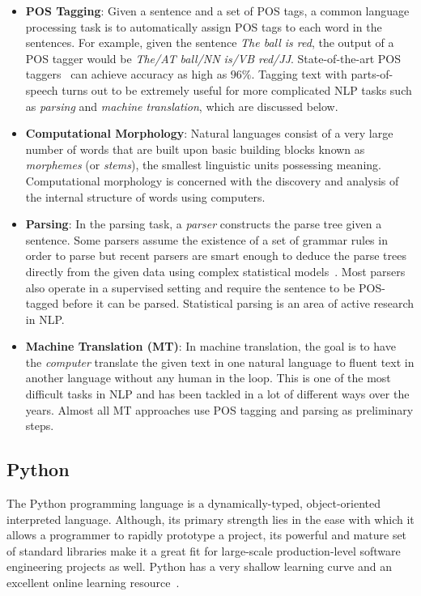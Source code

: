 \documentclass[11pt]{article}
\begin{document}
\begin{itemize}
	\item \textbf{POS Tagging}: Given a sentence and a set of POS tags, a common language processing task is to automatically assign POS tags to each word in the sentences. For example, given the sentence \emph{The ball is red}, the output of a POS tagger would be \emph{The/AT ball/NN is/VB red/JJ}. State-of-the-art POS taggers~\cite{maxentpos} can achieve accuracy as high as $96\%$. Tagging text with parts-of-speech turns out to be extremely useful for more complicated NLP tasks such as \emph{parsing} and \emph{machine translation}, which are discussed below.
	\item \textbf{Computational Morphology}: Natural languages consist of a very large number of words that are built upon basic building blocks known as \emph{morphemes} (or \emph{stems}), the smallest linguistic units possessing meaning. Computational morphology is concerned with the discovery and analysis of the internal structure of words using computers.
	\item \textbf{Parsing}: In the parsing task, a \emph{parser} constructs the parse tree given a sentence. Some parsers assume the existence of a set of grammar rules in order to parse but recent parsers are smart enough to deduce the parse trees directly from the given data using complex statistical models~\cite{bikelparser}. Most parsers also operate in a supervised setting and require the sentence to be POS-tagged before it can be parsed. Statistical parsing is an area of active research in NLP.
	\item \textbf{Machine Translation (MT)}: In machine translation, the goal is to have the \emph{computer} translate the given text in one natural language to fluent text in another language without any human in the loop. This is one of the most difficult tasks in NLP and has been tackled in a lot of different ways over the years. Almost all MT approaches use POS tagging and parsing as preliminary steps.
\end{itemize}

\subsection{Python}\label{sub:python} %
The Python programming language is a dynamically-typed, object-oriented interpreted language. Although, its primary strength lies in the ease with which it allows a programmer to rapidly prototype a project, its powerful and mature set of standard libraries make it a great fit for large-scale production-level software engineering projects as well. Python has a very shallow learning curve and an excellent online learning resource~\cite{pythontut}.
\end{document}
